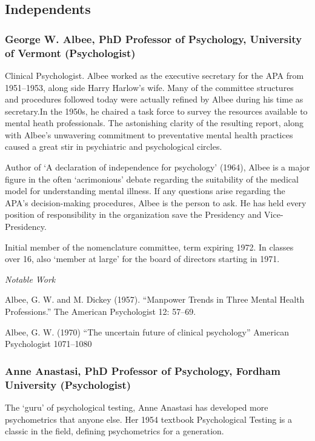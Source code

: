 \begin{refsection}
\subsection{Independents}
\label{independents}

\subsubsection{George W. Albee, PhD Professor of Psychology, University of Vermont (Psychologist)}
\label{georgew.albeephdprofessorofpsychologyuniversityofvermontpsychologist}

Clinical Psychologist. Albee worked as the executive secretary for the APA from 1951--1953, along side Harry Harlow's wife. Many of the committee structures and procedures followed today were actually refined by Albee during his time as secretary.In the 1950s, he chaired a task force to survey the resources available to mental heath professionals. The astonishing clarity of the resulting report, along with Albee's unwavering commitment to preventative mental health practices caused a great stir in psychiatric and psychological circles.

Author of `A declaration of independence for psychology' (1964), Albee is a major figure in the often `acrimonious' debate regarding the suitability of the medical model for understanding mental illness. If any questions arise regarding the APA's decision-making procedures, Albee is the person to ask. He has held every position of responsibility in the organization save the Presidency and Vice-Presidency.

Initial member of the nomenclature committee, term expiring 1972. In classes over 16, also `member at large' for the board of directors starting in 1971.

\emph{Notable Work}

Albee, G. W. and M. Dickey (1957). ``Manpower Trends in Three Mental Health Professions.'' The American Psychologist 12: 57--69.

Albee, G. W. (1970) ``The uncertain future of clinical psychology'' American Psychologist 1071--1080

\subsubsection{Anne Anastasi, PhD Professor of Psychology, Fordham University (Psychologist)}
\label{anneanastasiphdprofessorofpsychologyfordhamuniversitypsychologist}

The `guru' of psychological testing, Anne Anastasi has developed more psychometrics that anyone else. Her 1954 textbook Psychological Testing is a classic in the field, defining psychometrics for a generation.


\end{refsection}

